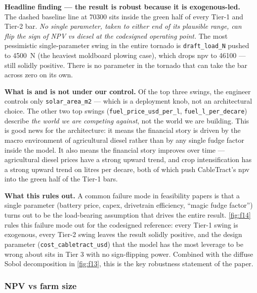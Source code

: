 \documentclass[11pt,a4paper]{article}
\begin{document}
\begin{itemize}[leftmargin=1.6em,itemsep=0.2em]
\end{itemize}

\textbf{Headline finding --- the result is robust because it is exogenous-led.} The dashed baseline line at \SI{70300}{\EUR} sits inside the green half of every Tier-1 and Tier-2 bar. \emph{No single parameter, taken to either end of its plausible range, can flip the sign of NPV vs diesel at the codesigned operating point.} The most pessimistic single-parameter swing in the entire tornado is \texttt{draft\_load\_N} pushed to \SI{4500}{\newton} (the heaviest moldboard plowing case), which drops \gls{npv} to \SI{46100}{\EUR} --- still solidly positive. There is no parameter in the tornado that can take the bar across zero on its own.

\textbf{What is and is not under our control.} Of the top three swings, the engineer controls only \texttt{solar\_area\_m2} --- which is a deployment knob, not an architectural choice. The other two top swings (\texttt{fuel\_price\_usd\_per\_l}, \texttt{fuel\_l\_per\_decare}) describe \emph{the world we are competing against}, not the world we are building. This is good news for the architecture: it means the financial story is driven by the macro environment of agricultural diesel rather than by any single fudge factor inside the model. It also means the financial story improves over time --- agricultural diesel prices have a strong upward trend, and crop intensification has a strong upward trend on litres per decare, both of which push CableTract's \gls{npv} into the green half of the Tier-1 bars.

\textbf{What this rules out.} A common failure mode in feasibility papers is that a single parameter (battery price, capex, drivetrain efficiency, ``magic fudge factor'') turns out to be the load-bearing assumption that drives the entire result. \cref{fig:f14} rules this failure mode out for the codesigned reference: every Tier-1 swing is exogenous, every Tier-2 swing leaves the result solidly positive, and the design parameter (\texttt{cost\_cabletract\_usd}) that the model has the most leverage to be wrong about sits in Tier 3 with no sign-flipping power. Combined with the diffuse Sobol decomposition in \cref{fig:f13}, this is the key robustness statement of the paper.

\subsubsection{NPV vs farm size}\label{sec:npv-farmsize}
\end{document}
